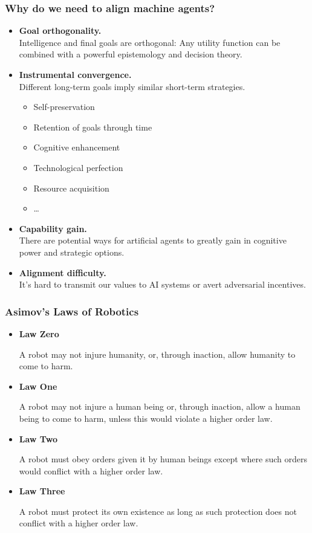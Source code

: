 \documentclass[UTF8,11pt,colorlinks,compress,openany]{beamer}%
\begin{document}
\begin{frame}\frametitle{Why do we need to align machine agents?}
\begin{itemize}
	\item \textbf{Goal orthogonality.}\\
	Intelligence and final goals are orthogonal: Any utility function can be combined with a powerful epistemology and decision theory.
	\item \textbf{Instrumental convergence.}\\
	Different long-term goals imply similar short-term strategies.
		\begin{itemize}
			\item Self-preservation
			\item Retention of goals through time
			\item Cognitive enhancement
			\item Technological perfection
			\item Resource acquisition
			\item \dots
		\end{itemize}
	\item \textbf{Capability gain.}\\
	There are potential ways for artificial agents to greatly gain in cognitive power and strategic options.
	\item \textbf{Alignment difficulty.}\\
	It's hard to transmit our values to AI systems or avert adversarial incentives.
\end{itemize}
\end{frame}

\begin{frame}\frametitle{Asimov's Laws of Robotics}
\begin{itemize}
	\item \textbf{Law Zero}

	A robot may not injure humanity, or, through inaction, allow humanity to come to harm.
	\item \textbf{Law One}

	A robot may not injure a human being or, through inaction, allow a human being to come to harm, unless this would violate a higher order law.
	\item \textbf{Law Two}

	A robot must obey orders given it by human beings except where such orders would conflict with a higher order law.
	\item \textbf{Law Three}

	A robot must protect its own existence as long as such protection does not conflict with a higher order law.
\end{itemize}
\end{frame}
\end{document}
